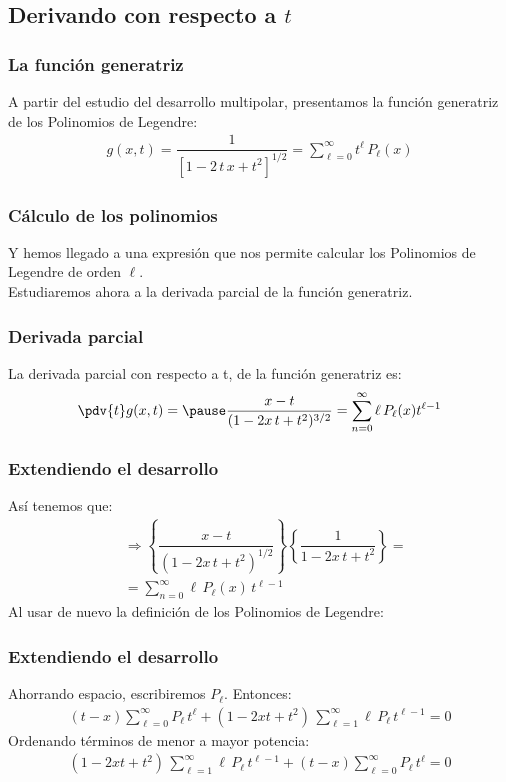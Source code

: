 \subsection{Derivando con respecto a \texorpdfstring{$t$}{t}}
\begin{frame}
\frametitle{La función generatriz}
A partir del estudio del desarrollo multipolar, presentamos la función generatriz de los Polinomios de Legendre:
\begin{align*}
g(x, t) = \dfrac{1}{\left[ 1 - 2 \, t \, x + t^{2} \right]^{1/2} } = \sum_{\ell=0}^{\infty} t^{\ell} \, P_{\ell} (x)
\end{align*}
\end{frame}
\begin{frame}
\frametitle{Cálculo de los polinomios}
Y hemos llegado a una expresión que nos permite calcular los Polinomios de Legendre de orden $\ell$.
\\
\bigskip
\pause
Estudiaremos ahora a la derivada parcial de la función generatriz.
\end{frame}
\begin{frame}
\frametitle{Derivada parcial}
La derivada parcial con respecto a t, de la función generatriz es:
\begin{eqnarray*}
\pdv{t} g(x, t) = \pause \dfrac{x - t}{( 1 - 2 x \, t + t^{2})^{3/2}} = \sum_{n=0}^{\infty} \ell \, P_{\ell} (x) t^{\ell -1}
\end{eqnarray*}
\end{frame}
\begin{frame}
\frametitle{Extendiendo el desarrollo}
Así tenemos que:
\begin{align*}
&\Rightarrow \left\{ \dfrac{x - t}{( 1 - 2 x \, t + t^{2})^{1/2}} \right\} \left\{ \dfrac{1}{ 1 - 2 x \, t + t^{2}} \right\} = \\[0.5em]
&= \sum_{n=0}^{\infty} \ell \, P_{\ell} (x) \, t^{\ell -1}
\end{align*}
\pause
Al usar de nuevo la definición de los Polinomios de Legendre:
\end{frame}
\begin{frame}
\frametitle{Extendiendo el desarrollo}
Ahorrando espacio, escribiremos $P_{\ell}$. Entonces:
\begin{align*}
(t {-} x) \sum_{\ell=0}^{\infty} P_{\ell} \, t^{\ell} + ( 1 {-} 2 x t {+} t^{2}) \, \sum_{\ell=1}^{\infty} \ell \, P_{\ell} \, t^{\ell-1} = 0
\end{align*}
\pause
Ordenando términos de menor a mayor potencia:
\begin{align*}
(1 {-} 2 x t {+} t^{2}) \, \sum_{\ell=1}^{\infty} \ell \, P_{\ell} \, t^{\ell-1} {+} (t {-} x) \sum_{\ell=0}^{\infty} P_{\ell} \, t^{\ell} = 0
\end{align*}
\end{frame}
